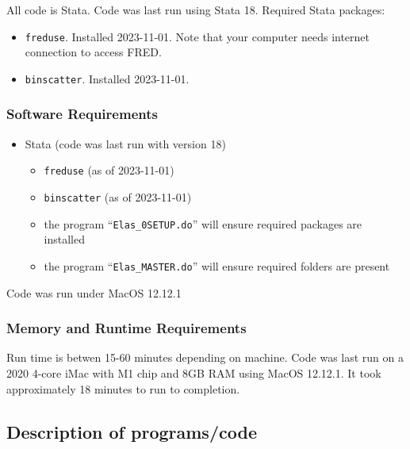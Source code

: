 \documentclass[
]{article}
\providecommand{\tightlist}{%
  \setlength{\itemsep}{0pt}\setlength{\parskip}{0pt}}
\begin{document}
All code is Stata. Code was last run using Stata 18. Required Stata packages:
\begin{itemize}
  \item \texttt{freduse}. Installed 2023-11-01. Note that your computer needs internet connection to access FRED.
  \item \texttt{binscatter}. Installed 2023-11-01.
\end{itemize}


\hypertarget{software-requirements}{%
\subsubsection{Software Requirements}\label{software-requirements}}

\begin{itemize}
\tightlist
\item
  Stata (code was last run with version 18)

  \begin{itemize}
  \tightlist
  \item
    \texttt{freduse} (as of 2023-11-01)
  \item 
    \texttt{binscatter} (as of 2023-11-01)
  \item
    the program ``\texttt{Elas\_0SETUP.do}'' will ensure required packages are installed
  \item 
    the program ``\texttt{Elas\_MASTER.do}'' will ensure required folders are present
  \end{itemize}
\end{itemize}

Code was run under MacOS 12.12.1


\hypertarget{memory-and-runtime-requirements}{%
\subsubsection{Memory and Runtime
Requirements}\label{memory-and-runtime-requirements}}

Run time is betwen 15-60 minutes depending on machine. Code was last run on a 2020 4-core iMac with M1 chip and 8GB RAM using MacOS 12.12.1. It took approximately 18 minutes to run to completion.

\hypertarget{description-of-programscode}{%
\subsection{Description of
programs/code}\label{description-of-programscode}}
\end{document}
